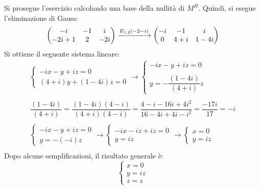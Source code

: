 \documentclass[a4paper]{article}
\begin{document}
	\noindent
	Si prosegue l'esercizio calcolando una base della nullità di $M^{H}$. Quindi, si esegue l'eliminazione di Gauss:
	\begin{equation*}
		\begin{pmatrix}
			-i 		& -1	& i \\
			-2i+1	& 2		& -2i
		\end{pmatrix}
		\xlongrightarrow{E_{1,2}\left(-2-i\right)}
		\begin{pmatrix}
			-i 	& -1	& i \\
			0	& 4+i	& 1-4i
		\end{pmatrix}
	\end{equation*}
	Si ottiene il seguente sistema lineare:
	\begin{gather*}
		\begin{cases}
			-ix -y +iz = 0 \\
			\left(4+i\right)y + \left(1-4i\right) z = 0
		\end{cases}
		\longrightarrow
		\begin{cases}
			-ix -y +iz = 0 \\
			\\
			y = -\dfrac{\left(1-4i\right)}{\left(4+i\right)} z
		\end{cases}\\
		\\
		\dfrac{\left(1-4i\right)}{\left(4+i\right)} = \dfrac{\left(1-4i\right)\left(4-i\right)}{\left(4+i\right)\left(4-i\right)} = \dfrac{4-i-16i+4i^{2}}{16-4i+4i-i^2} = \dfrac{-17i}{17} = -i \\
		\\
		\begin{cases}
			-ix -y +iz = 0 \\
			y = -\left(-i\right) z
		\end{cases}
		\longrightarrow
		\begin{cases}
			-ix -iz +iz = 0 \\
			y = i z
		\end{cases}
		\longrightarrow
		\begin{cases}
			x = 0 \\
			y = i z
		\end{cases}\\
	\end{gather*}
	Dopo alcune semplificazioni, il risultato generale è:
	\begin{equation*}
		\begin{cases}
			x = 0 \\
			y = iz \\
			z = z
		\end{cases}
	\end{equation*}
\end{document}
